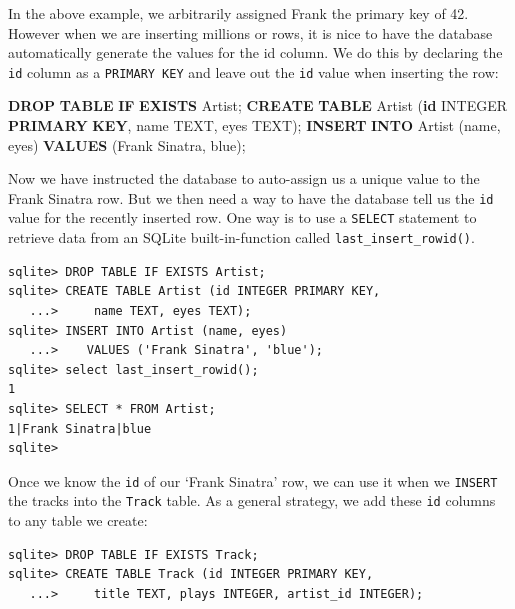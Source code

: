 \documentclass[10pt,]{book}
\newenvironment{Shaded}{}{}
\newcommand{\ControlFlowTok}[1]{\textcolor[rgb]{0.00,0.44,0.13}{\textbf{#1}}}
\newcommand{\DataTypeTok}[1]{\textcolor[rgb]{0.56,0.13,0.00}{#1}}
\newcommand{\KeywordTok}[1]{\textcolor[rgb]{0.00,0.44,0.13}{\textbf{#1}}}
\newcommand{\NormalTok}[1]{#1}
\newcommand{\StringTok}[1]{\textcolor[rgb]{0.25,0.44,0.63}{#1}}
\begin{document}
   In the
above example, we arbitrarily assigned Frank the primary key of 42.
However when we are inserting millions or rows, it is nice to have the
database automatically generate the values for the id column. We do this
by declaring the \texttt{id} column as a \texttt{PRIMARY\ KEY} and leave
out the \texttt{id} value when inserting the row:

\begin{Shaded}
\begin{Highlighting}[]
\KeywordTok{DROP} \KeywordTok{TABLE} \ControlFlowTok{IF} \KeywordTok{EXISTS}\NormalTok{ Artist;}
\KeywordTok{CREATE} \KeywordTok{TABLE}\NormalTok{ Artist (}\KeywordTok{id} \DataTypeTok{INTEGER} \KeywordTok{PRIMARY} \KeywordTok{KEY}\NormalTok{,}
\NormalTok{    name TEXT, eyes TEXT);}
\KeywordTok{INSERT} \KeywordTok{INTO}\NormalTok{ Artist (name, eyes)}
   \KeywordTok{VALUES}\NormalTok{ (}\StringTok{\textquotesingle{}Frank Sinatra\textquotesingle{}}\NormalTok{, }\StringTok{\textquotesingle{}blue\textquotesingle{}}\NormalTok{);}
\end{Highlighting}
\end{Shaded}

Now we have instructed the database to auto-assign us a unique value to
the Frank Sinatra row. But we then need a way to have the database tell
us the \texttt{id} value for the recently inserted row. One way is to
use a \texttt{SELECT} statement to retrieve data from an SQLite
built-in-function called \texttt{last\_insert\_rowid()}.

{\small
\begin{verbatim}
sqlite> DROP TABLE IF EXISTS Artist;
sqlite> CREATE TABLE Artist (id INTEGER PRIMARY KEY,
   ...>     name TEXT, eyes TEXT);
sqlite> INSERT INTO Artist (name, eyes)
   ...>    VALUES ('Frank Sinatra', 'blue');
sqlite> select last_insert_rowid();
1
sqlite> SELECT * FROM Artist;
1|Frank Sinatra|blue
sqlite>
\end{verbatim}
}

Once we know the \texttt{id} of our `Frank Sinatra' row, we can use it
when we \texttt{INSERT} the tracks into the \texttt{Track} table. As a
general strategy, we add these \texttt{id} columns to any table we
create:

{\small
\begin{verbatim}
sqlite> DROP TABLE IF EXISTS Track;
sqlite> CREATE TABLE Track (id INTEGER PRIMARY KEY,
   ...>     title TEXT, plays INTEGER, artist_id INTEGER);
\end{verbatim}
}
\end{document}
